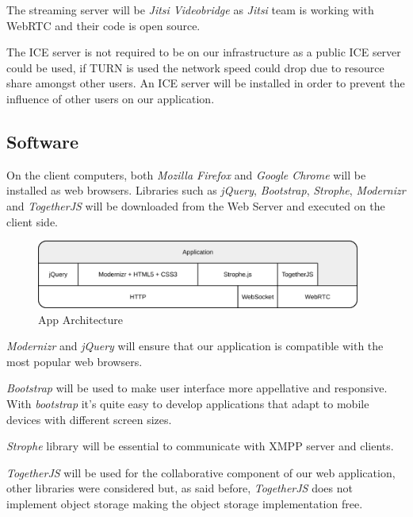 The streaming server will be \emph{Jitsi Videobridge} as \emph{Jitsi} team is working with \ac{WebRTC} and their code is open source.

The \ac{ICE} server is not required to be on our infrastructure as a public \ac{ICE} server could be used, if \ac{TURN} is used the network speed could drop due to resource share amongst other users. An \ac{ICE} server will be installed in order to prevent the influence of other users on our application.

\subsection{Software}

On the client computers, both \emph{Mozilla Firefox} and \emph{Google Chrome} will be installed as web browsers. Libraries such as \emph{jQuery}, \emph{Bootstrap}, \emph{Strophe}, \emph{Modernizr} and \emph{TogetherJS} will be downloaded from the Web Server and executed on the client side.

\begin{figure}[H]
	\centering
	\includegraphics[width=0.95\textwidth]{figures/apparch.png}
	\caption{App Architecture}
\end{figure}

\emph{Modernizr} and \emph{jQuery} will ensure that our application is compatible with the most popular web browsers.

\emph{Bootstrap} will be used to make user interface more appellative and responsive. With \emph{bootstrap} it's quite easy to develop applications that adapt to mobile devices with different screen sizes.

\emph{Strophe} library will be essential to communicate with \ac{XMPP} server and clients.

\emph{TogetherJS} will be used for the collaborative component of our web application, other libraries were considered but, as said before, \emph{TogetherJS} does not implement object storage making the object storage implementation free.